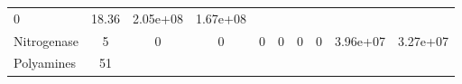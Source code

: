 \documentclass[]{article}
\begin{document}
\begin{longtable}[]{@{}lccccccccc@{}}
\begin{minipage}[t]{0.08\columnwidth}
0\strut
\end{minipage} & \begin{minipage}[t]{0.08\columnwidth}\centering\strut
18.36\strut
\end{minipage} & \begin{minipage}[t]{0.08\columnwidth}\centering\strut
2.05e+08\strut
\end{minipage} & \begin{minipage}[t]{0.08\columnwidth}\centering\strut
1.67e+08\strut
\end{minipage}\tabularnewline
\begin{minipage}[t]{0.07\columnwidth}\raggedright\strut
Nitrogenase\strut
\end{minipage} & \begin{minipage}[t]{0.06\columnwidth}\centering\strut
5\strut
\end{minipage} & \begin{minipage}[t]{0.08\columnwidth}\centering\strut
0\strut
\end{minipage} & \begin{minipage}[t]{0.08\columnwidth}\centering\strut
0\strut
\end{minipage} & \begin{minipage}[t]{0.08\columnwidth}\centering\strut
0\strut
\end{minipage} & \begin{minipage}[t]{0.08\columnwidth}\centering\strut
0\strut
\end{minipage} & \begin{minipage}[t]{0.08\columnwidth}\centering\strut
0\strut
\end{minipage} & \begin{minipage}[t]{0.08\columnwidth}\centering\strut
0\strut
\end{minipage} & \begin{minipage}[t]{0.08\columnwidth}\centering\strut
3.96e+07\strut
\end{minipage} & \begin{minipage}[t]{0.08\columnwidth}\centering\strut
3.27e+07\strut
\end{minipage}\tabularnewline
\begin{minipage}[t]{0.07\columnwidth}\raggedright\strut
Polyamines\strut
\end{minipage} & \begin{minipage}[t]{0.06\columnwidth}\centering\strut
51\strut
\end{minipage} & \begin{minipage}[t]{0.08\columnwidth}\centering\strut

\end{minipage}
\end{longtable}
\end{document}
